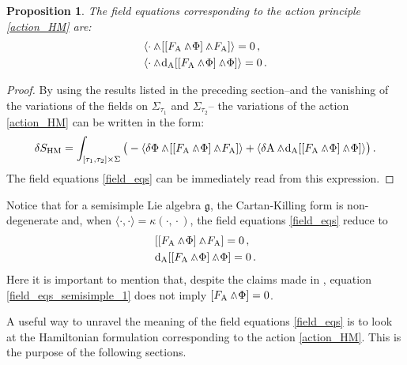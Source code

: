 \documentclass[12pt]{amsart}
\theoremstyle{plain}
\newtheorem{proposition}[theorem]{Proposition}
\theoremstyle{definition}
\theoremstyle{remark}
\newcommand{\wed}{\wedge\hspace*{-7.5pt}.\hspace*{3pt}}
\numberwithin{equation}{section}  %
\begin{document}
\begin{proposition}
    The field equations corresponding to the action principle \eqref{action_HM} are:
    \begin{subequations}\label{field_eqs}
\begin{align}
&{\langle\cdot\wed [[F_\mathrm{A}\wed\Phi]\wed F_\mathrm{A}]  \rangle}=0\,,\label{field_eqs_1}\\
&{\langle\cdot\wed \mathrm{d}_\mathrm{A}[[F_\mathrm{A}\wed\Phi]\wed \Phi] \rangle}=0\,.\label{field_eqs_2}
\end{align}
\end{subequations}
\end{proposition}
\begin{proof}
By using the results listed in the preceding section--and the vanishing of the variations of the fields on \(\Sigma_{\tau_1}\) and \(\Sigma_{\tau_2}\)-- the variations of the action \eqref{action_HM} can be written in the form:
\begin{equation}\label{variation}
\delta S_{\mathrm{HM}}=\int_{[\tau_1,\tau_2]\times \Sigma }\big(-\langle \delta\Phi\wed [[F_\mathrm{A}\wed\Phi]\wed F_\mathrm{A}] \rangle+ \langle \delta \mathrm{A}\wed \mathrm{d}_\mathrm{A} [[ F_\mathrm{A}\wed \Phi ]\wed \Phi ] \rangle \big)\,.
\end{equation}
The field equations \eqref{field_eqs} can be immediately read from this expression.
\end{proof}

Notice that for a semisimple Lie algebra $\mathfrak{g}$, the Cartan-Killing form is non-degenerate and, when \(\langle \cdot,\!\cdot \rangle =\kappa(\cdot,\!\cdot)\),  the field equations \eqref{field_eqs} reduce to
\begin{subequations}
\begin{align}
& [[F_\mathrm{A}\wed \Phi ]\wed F_\mathrm{A}]=0\,,\label{field_eqs_semisimple_1}\\
& \mathrm{d}_\mathrm{A}[[F_\mathrm{A}\wed \Phi]\wed \Phi]=0\,.\label{field_eqs_semisimple_2}
\end{align}
\end{subequations}
Here it is important to mention that, despite the claims made in \cite{HM}, equation \eqref{field_eqs_semisimple_1} does not imply \([F_\mathrm{A}\wed\Phi]=0\).

A useful way to unravel the meaning of the field equations \eqref{field_eqs} is to look at the Hamiltonian formulation corresponding to the action \eqref{action_HM}. This is the purpose of the following sections.
\end{document}
